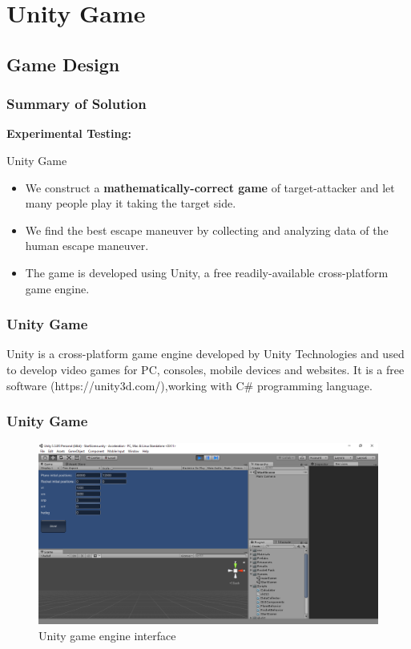 \documentclass{beamer}
\begin{document}

\section{Unity Game}

\subsection{Game Design}
\begin{frame}
\frametitle{Summary of Solution}
\textbf{Experimental Testing:}
\begin{alertblock}{Unity Game}
	\begin{itemize}
		\item We construct a \textbf{mathematically-correct game} of target-attacker and let many people play it taking the target side. 
		\item We find the best escape maneuver by collecting and analyzing data of the human escape maneuver. 
		\item The game is developed using Unity, a free readily-available cross-platform game engine.
	\end{itemize}
\end{alertblock}
\end{frame}
\begin{frame}
\frametitle{Unity Game}
Unity is a cross-platform game engine developed by Unity Technologies and used to develop video games for PC, consoles, mobile devices and websites. It is a free software (https://unity3d.com/),working with C\# programming language. 
\end{frame}
\begin{frame}
\frametitle{Unity Game}
\begin{figure}[H]
	\centering
	\includegraphics[scale = 0.2]{fig/unityInterface.PNG}
	\caption{Unity game engine interface }
	\label{UnityInterface}
\end{figure}
\end{frame}
\end{document}
